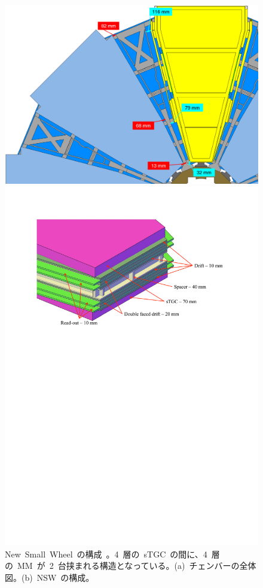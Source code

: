 \begin{figure}[tbp]
    \begin{minipage}{0.49\hsize}
	\centering			
	\includegraphics[width=\textwidth,page=1]{img/pdf/fig_026c.png}
	\subcaption{}
	\end{minipage}
	\begin{minipage}{0.49\hsize}
	\centering
	\includegraphics[width=\textwidth,page=1]{img/pdf/fig_042a.pdf}
	\subcaption{}
	\end{minipage}
    \caption[New~Small~Wheel~の構成]{New~Small~Wheel~の構成~\cite{AR:14}。4~層の~sTGC~の間に、4~層の~MM~が~2~台挟まれる構造となっている。(a)~チェンバーの全体図。(b)~NSW~の構成。}
    \label{fig:nsw}
\end{figure}

